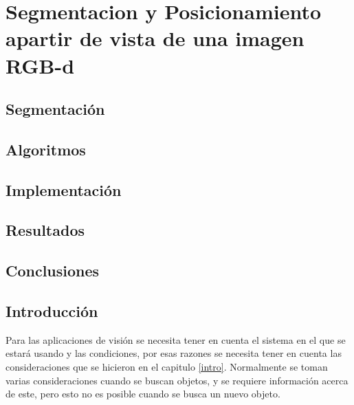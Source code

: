     \chapter{Segmentacion y Posicionamiento apartir de vista de una imagen RGB-d}
    
    
    
    \section{Segmentación}
    
    \section{Algoritmos}
    
    \section{Implementación}
    
    \section{Resultados}
    
    \section{Conclusiones}
    
    
    
    
    
    
    
    
    
    
    
    
    
    
    
    
    
    
    
    
    
    
    
    
    \section{Introducción}

Para las aplicaciones de visión se necesita tener en cuenta el sistema en el que se estará usando y las condiciones, por esas razones se necesita tener en cuenta las consideraciones que se hicieron en el capitulo \ref{intro}. Normalmente se toman varias consideraciones cuando se buscan objetos, y se requiere información acerca de este, pero esto no es posible cuando se busca un nuevo objeto.

